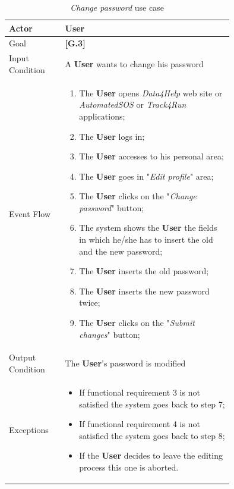 \begin{center}
\begin{table}[H]
\begin{tabular}{ | l | p{0.75\linewidth} | }
  \hline
    Actor & \textbf{User} \\ \hline
    Goal & \textbf{[G.3]} \\ \hline
    Input Condition & A \textbf{User} wants to change his password\\ \hline
    Event Flow & \begin{minipage}[t]{0.7\textwidth}
      \begin{enumerate}
        \item The \textbf{User} opens \textit{Data4Help} web site or \textit{AutomatedSOS} or \textit{Track4Run} applications;
        \item The \textbf{User} logs in;
        \item The \textbf{User} accesses to his personal area;
        \item The \textbf{User} goes in "\textit{Edit profile}" area;
        \item The \textbf{User} clicks on the "\textit{Change password}" button;
        \item The system shows the \textbf{User} the fields in which he/she has to insert the old and the new password;
        \item The \textbf{User} inserts the old password;
        \item The \textbf{User} inserts the new password twice;
        \item The \textbf{User} clicks on the "\textit{Submit changes}" button;
      \end{enumerate}
    \smallskip
  \end{minipage} \\ \hline
  Output Condition & The \textbf{User}'s password is modified\\ \hline
  Exceptions & \begin{minipage}[t]{0.7\textwidth}
    \begin{itemize}
      \smallskip
      \item If functional requirement 3 is not satisfied the system goes back to step 7;
      \item If functional requirement 4 is not satisfied the system goes back to step 8;
      \item If the \textbf{User} decides to leave the editing process this one is aborted.
    \end{itemize}
    \smallskip
  \end{minipage}  \\ \hline
\end{tabular}
\caption{\textit{Change password} use case}
\label{table:changePassowrdTable}
\end{table}
\end{center}

